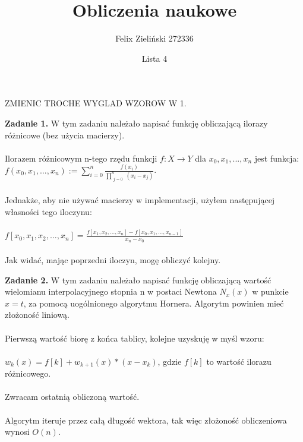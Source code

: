 \documentclass[15pt, a4paper]{article}
\title{Obliczenia naukowe}
\author{Felix Zieliński 272336}
\date{Lista 4}
\begin{document}
\maketitle

\vspace{0.5cm}

ZMIENIC TROCHE WYGLAD WZOROW W 1.

\noindent\hrulefill

\vspace{0.5cm}


\noindent\textbf{Zadanie 1.} W tym zadaniu należało napisać funkcję obliczającą ilorazy różnicowe (bez użycia macierzy).\\\\
Ilorazem różnicowym n-tego rzędu funkcji \(f: X \rightarrow Y \) dla \(x_0, x_1, ..., x_n\) jest funkcja: \( f(x_0, x_1, \dots, x_n) := \sum_{i=0}^{n} \frac{f(x_i)}{\prod_{\substack{j=0 }}^{n} (x_i - x_j)} \).\\\\ Jednakże, aby nie używać macierzy w implementacji, użyłem następującej własności tego iloczynu: \\\\\( f[x_0, x_1, x_2, \ldots, x_n] = \frac{f[x_1, x_2, \ldots, x_n] - f[x_0, x_1, \ldots, x_{n-1}]}{x_n - x_0}\)\\\\
Jak widać, mając poprzedni iloczyn, mogę obliczyć kolejny. 

\vspace{0.5cm}

\noindent\hrulefill

\vspace{0.5cm}


\noindent\textbf{Zadanie 2.} W tym zadaniu należało napisać funkcję obliczającą wartość wielomianu interpolacyjnego stopnia n w postaci Newtona \(N_x(x)\) w punkcie \(x = t\), za pomocą uogólnionego algorytmu Hornera. Algorytm powinien mieć złożoność liniową.\\\\
Pierwszą wartość biorę z końca tablicy, kolejne uzyskuję w myśl wzoru:\\\\
\(w_k(x) = f[k] + w_{k+1}(x)*(x - x_k)\), gdzie \(f[k]\) to wartość ilorazu różnicowego.\\\\
Zwracam ostatnią obliczoną wartość.\\\\
Algorytm iteruje przez całą długość wektora, tak więc złożoność obliczeniowa wynosi \(O(n)\).
\end{document}
